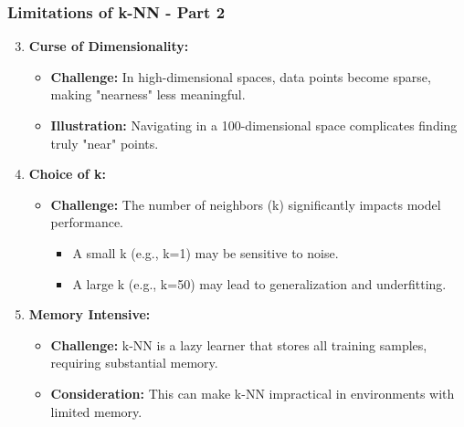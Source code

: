 \documentclass[aspectratio=169]{beamer}
\begin{document}
\begin{frame}[fragile]
    \frametitle{Limitations of k-NN - Part 2}
    \begin{enumerate}
        \setcounter{enumi}{2} %
        \item \textbf{Curse of Dimensionality:}
            \begin{itemize}
                \item \textbf{Challenge:} In high-dimensional spaces, data points become sparse, making "nearness" less meaningful.
                \item \textbf{Illustration:} Navigating in a 100-dimensional space complicates finding truly "near" points.
            \end{itemize}
        
        \item \textbf{Choice of k:}
            \begin{itemize}
                \item \textbf{Challenge:} The number of neighbors (k) significantly impacts model performance. 
                \begin{itemize}
                    \item A small k (e.g., k=1) may be sensitive to noise.
                    \item A large k (e.g., k=50) may lead to generalization and underfitting.
                \end{itemize}
            \end{itemize}

        \item \textbf{Memory Intensive:}
            \begin{itemize}
                \item \textbf{Challenge:} k-NN is a lazy learner that stores all training samples, requiring substantial memory.
                \item \textbf{Consideration:} This can make k-NN impractical in environments with limited memory.
            \end{itemize}
    \end{enumerate}
\end{frame}
\end{document}
